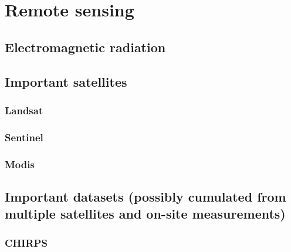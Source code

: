 \section{Remote sensing}

\subsection{Electromagnetic radiation}


\subsection{Important satellites}

\subsubsection{Landsat}

\subsubsection{Sentinel}

\subsubsection{Modis}


\subsection{Important datasets (possibly cumulated from multiple satellites and on-site measurements)}

\subsubsection{CHIRPS}